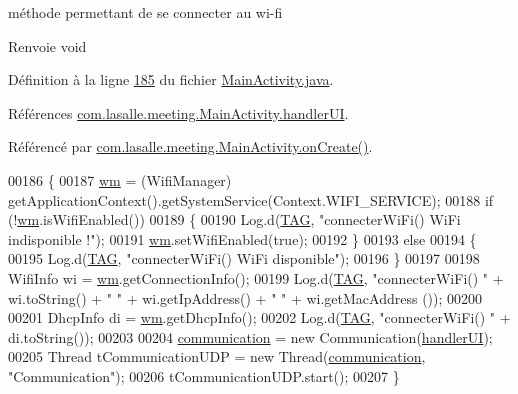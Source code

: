 méthode permettant de se connecter au wi-\/fi 

\begin{DoxyReturn}{Renvoie}
void 
\end{DoxyReturn}


Définition à la ligne \hyperlink{_main_activity_8java_source_l00185}{185} du fichier \hyperlink{_main_activity_8java_source}{Main\+Activity.\+java}.



Références \hyperlink{_main_activity_8java_source_l00345}{com.\+lasalle.\+meeting.\+Main\+Activity.\+handler\+UI}.



Référencé par \hyperlink{_main_activity_8java_source_l00072}{com.\+lasalle.\+meeting.\+Main\+Activity.\+on\+Create()}.


\begin{DoxyCode}
00186     \{
00187         \hyperlink{classcom_1_1lasalle_1_1meeting_1_1_main_activity_ae7f6d13e941fdf4d6147df3a79e1aa22}{wm} = (WifiManager) getApplicationContext().getSystemService(Context.WIFI\_SERVICE);
00188         \textcolor{keywordflow}{if} (!\hyperlink{classcom_1_1lasalle_1_1meeting_1_1_main_activity_ae7f6d13e941fdf4d6147df3a79e1aa22}{wm}.isWifiEnabled())
00189         \{
00190             Log.d(\hyperlink{classcom_1_1lasalle_1_1meeting_1_1_main_activity_a8f934680ad3a7ec4ad0fea748f0b7506}{TAG}, \textcolor{stringliteral}{"connecterWiFi() WiFi indisponible !"});
00191             \hyperlink{classcom_1_1lasalle_1_1meeting_1_1_main_activity_ae7f6d13e941fdf4d6147df3a79e1aa22}{wm}.setWifiEnabled(\textcolor{keyword}{true});
00192         \}
00193         \textcolor{keywordflow}{else}
00194         \{
00195             Log.d(\hyperlink{classcom_1_1lasalle_1_1meeting_1_1_main_activity_a8f934680ad3a7ec4ad0fea748f0b7506}{TAG}, \textcolor{stringliteral}{"connecterWiFi() WiFi disponible"});
00196         \}
00197 
00198         WifiInfo wi = \hyperlink{classcom_1_1lasalle_1_1meeting_1_1_main_activity_ae7f6d13e941fdf4d6147df3a79e1aa22}{wm}.getConnectionInfo();
00199         Log.d(\hyperlink{classcom_1_1lasalle_1_1meeting_1_1_main_activity_a8f934680ad3a7ec4ad0fea748f0b7506}{TAG}, \textcolor{stringliteral}{"connecterWiFi() "} + wi.toString() + \textcolor{stringliteral}{" "} + wi.getIpAddress() + \textcolor{stringliteral}{" "} + wi.getMacAddress
      ());
00200 
00201         DhcpInfo di = \hyperlink{classcom_1_1lasalle_1_1meeting_1_1_main_activity_ae7f6d13e941fdf4d6147df3a79e1aa22}{wm}.getDhcpInfo();
00202         Log.d(\hyperlink{classcom_1_1lasalle_1_1meeting_1_1_main_activity_a8f934680ad3a7ec4ad0fea748f0b7506}{TAG}, \textcolor{stringliteral}{"connecterWiFi() "} + di.toString());
00203 
00204         \hyperlink{classcom_1_1lasalle_1_1meeting_1_1_main_activity_a6a358d10ba0f56af3b548e41902db273}{communication} = \textcolor{keyword}{new} Communication(\hyperlink{classcom_1_1lasalle_1_1meeting_1_1_main_activity_a7cf3c4cd95f0f7cb43c077937f80ab8c}{handlerUI});
00205         Thread tCommunicationUDP = \textcolor{keyword}{new} Thread(\hyperlink{classcom_1_1lasalle_1_1meeting_1_1_main_activity_a6a358d10ba0f56af3b548e41902db273}{communication}, \textcolor{stringliteral}{"Communication"});
00206         tCommunicationUDP.start();
00207     \}
\end{DoxyCode}
